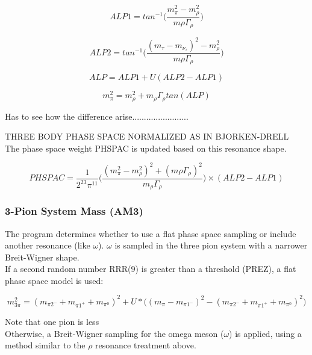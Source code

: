 \documentclass[12pt]{article}
\begin{document}
\[ ALP1 = tan^{-1}\Big(\frac{m_\pi^2- m_\rho^2}{m\rho \Gamma_\rho}\Big)\]


\[ALP2 = tan^{-1}\Big(\frac{(m_\tau - m_{\nu_\tau})^2- m_\rho^2}{m\rho \Gamma_\rho}\Big)\]

\[ALP = ALP1+ U(ALP2-ALP1)\]

\[m_\pi^2 =  m_\rho^2 + m_\rho \Gamma_\rho tan(ALP)\]

Has to see how the difference arise........................\\

\vspace{1cm}

THREE BODY PHASE SPACE NORMALIZED AS IN BJORKEN-DRELL\\

The phase space weight PHSPAC is updated based on this resonance shape.

\[PHSPAC = \frac{1}{2^{23}\pi^{11}}\Big( \frac{(m_\pi^2-m_\rho^2)^2+ (m\rho \Gamma_\rho)^2}{m_\rho \Gamma_\rho}\Big) \times (ALP2-ALP1)\]



\subsubsection{3-Pion System Mass (AM3)}

The program determines whether to use a flat phase space sampling or include another resonance (like $\omega$). $\omega$ is sampled in the three pion system with a narrower Breit-Wigner shape. \\

If a second random number RRR(9) is greater than a threshold (PREZ), a flat phase space model is used:

\[m_{3\pi}^2 = ( m_{\pi2^-} + m_{\pi1^+} + m_{\pi^0})^2 + U* \Big((m_\pi - m_{\pi1^-})^2 - ( m_{\pi2^-} + m_{\pi1^+} + m_{\pi^0})^2\Big)\]


Note that one pion is less\\

Otherwise, a Breit-Wigner sampling for the omega meson ($\omega$) is applied, using a method similar to the $\rho$ resonance treatment above.\\
\end{document}

